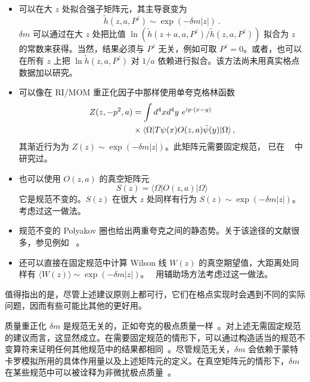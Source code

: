 \begin{itemize}
\item{可以在大 $z$ 处拟合强子矩阵元，其主导衰变为
\begin{equation}\label{eq:mass1}
  \tilde h(z,a, P^z) \sim \exp(-\delta m |z|) \ .
\end{equation}
$\delta m$ 可以通过在大 $z$ 处把比值 $\ln (\tilde h(z+a,a, P^z)/\tilde h(z,a, P^z))$
拟合为 $z$ 的常数来获得。当然，结果必须与 $P^z$ 无关，例如可取 $P^z=0$。或者，也可以在所有 $z$ 上把 $\ln \tilde h(z,a, P^z)$ 对 $1/a$
依赖进行拟合。该方法尚未用真实格点数据加以研究。}
\item{可以像在 RI/MOM 重正化因子中那样使用单夸克格林函数
\begin{align}
          Z(z,-p^2,a)&=\int d^4x d^4y\ e^{ip\cdot (x-y)}\nonumber\\
          &\times  \langle \Omega|T\psi(x) O(z,a) \bar{\psi}(y)|\Omega\rangle\,,
\end{align}
其渐近行为为 $Z(z) \sim \exp(-\delta m |z|)$。此矩阵元需要固定规范，
已在 ~\cite{Izubuchi:2019lyk,Huo:2019vdl} 中研究过。}
\item{也可以使用 $O(z,a)$ 的真空矩阵元
\begin{equation}
        S(z) = \langle \Omega|O(z,a)|\Omega\rangle
\end{equation}
它是规范不变的。$S(z)$ 在很大 $z$ 处同样有行为
$S(z) \sim \exp(-\delta m |z|)$。~\cite{Braun:2018brg,Li:2020xml} 考虑过这一做法。
}
\item{规范不变的 Polyakov 圈也给出两重夸克之间的静态势。关于该途径的文献很多，参见例如 ~\cite{Appelquist:1977tw,Schroder:1999xf,Smirnov:2009fh,Philipsen:2002az,Jahn:2004qr}。}
\item{还可以直接在固定规范中计算 Wilson 线 $W(z)$ 的真空期望值，大距离处同样有 $\langle W(z) \rangle \sim \exp(-\delta m |z|)$。~\cite{Green:2017xeu,Green:2020xco} 用辅助场方法考虑过这一做法。}
\end{itemize}
值得指出的是，尽管上述建议原则上都可行，它们在格点实现时会遇到不同的实际问题，因而有些可能比其他的更好用。

质量重正化 $\delta m$ 是规范无关的，正如夸克的极点质量一样~\cite{Kronfeld:1998di}。对上述无需固定规范的建议而言，这显然成立。在需要固定规范的情形下，可以通过构造适当的规范不变算符来证明任何其他规范中的结果都相同~\cite{Philipsen:2001ip}。尽管规范无关，$\delta m$ 会依赖于蒙特卡罗模拟所用的具体作用量以及上述矩阵元的定义。在真空矩阵元的情形下，$\delta m$ 在某些规范中可以被诠释为非微扰极点质量~\cite{Philipsen:2001ip}。

